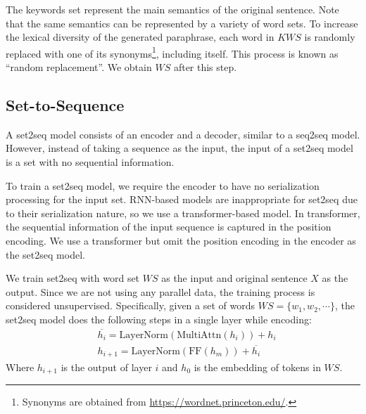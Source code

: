 The keywords set represent the main semantics of the original sentence.
Note that the same semantics can be represented by a variety of word sets.
To increase the lexical diversity of the generated paraphrase,
each word in $KWS$ is randomly replaced with one of its synonyms\footnote{Synonyms 
are obtained from \url{https://wordnet.princeton.edu/}.}, including itself. This process is known as ``random replacement''. We obtain $WS$ after this step.


\subsection{Set-to-Sequence} \label{sec:set2seq}
A set2seq model consists of an encoder and a decoder, similar to a seq2seq model. However, instead of taking a sequence as the input, the input of a set2seq model is a set with no sequential information.

To train a set2seq model, we require the encoder to have no serialization processing for the input set. RNN-based models are inappropriate for set2seq due to their serialization nature, so we use a transformer-based model. In transformer, the sequential information of the input sequence is captured in the position encoding. We use a transformer but omit the position encoding in the encoder as the set2seq model.

We train set2seq with word set $WS$ as the input and original sentence $X$ as the output. Since we are not using any parallel data, the training process is considered unsupervised.  Specifically, given a set of words $WS = \{w_1, w_2,\cdots\}$, the set2seq model does the following steps in a single layer while encoding:
\begin{align}
& \overline{h_{i}} = \text{LayerNorm}(\text{MultiAttn}(h_{i})) + h_{i} \\
& h_{i+1} = \text{LayerNorm}(\text{FF}(h_{m})) + \overline{h_{i}}
\end{align}
Where $h_{i+1}$ is the output of layer $i$ and $h_0$ is the embedding of tokens in $WS$.

